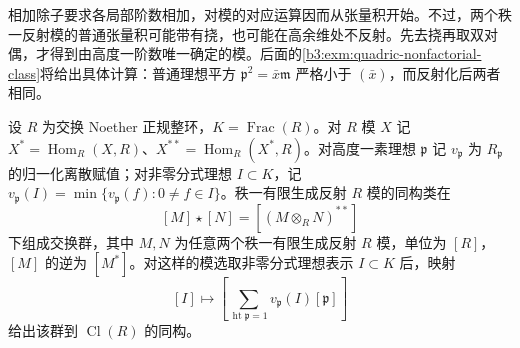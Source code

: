 相加除子要求各局部阶数相加，对模的对应运算因而从张量积开始。不过，两个秩一反射模的普通张量积可能带有挠，也可能在高余维处不反射。先去挠再取双对偶，才得到由高度一阶数唯一确定的模。后面的\cref{b3:exm:quadric-nonfactorial-class}将给出具体计算：普通理想平方 \(\mathfrak p^2=\bar x\mathfrak m\) 严格小于 \((\bar x)\)，而反射化后两者相同。

\begin{theorem}\label{b3:thm:class-group-reflexive}
	设 \(R\) 为交换 Noether 正规整环，\(K=\operatorname{Frac}(R)\)。对 \(R\) 模 \(X\) 记 \(X^*=\operatorname{Hom}_R(X,R)\)、\(X^{**}=\operatorname{Hom}_R(X^*,R)\)。对高度一素理想 \(\mathfrak p\) 记 \(v_{\mathfrak p}\) 为 \(R_{\mathfrak p}\) 的归一化离散赋值；对非零分式理想 \(I\subset K\)，记 \(v_{\mathfrak p}(I)=\min\{v_{\mathfrak p}(f):0\ne f\in I\}\)。秩一有限生成反射 \(R\) 模的同构类在
	\[
		[M]\mathbin{\star}[N]=[(M\otimes_RN)^{**}]
	\]
	下组成交换群，其中 \(M,N\) 为任意两个秩一有限生成反射 \(R\) 模，单位为 \([R]\)，\([M]\) 的逆为 \([M^*]\)。对这样的模选取非零分式理想表示 \(I\subset K\) 后，映射
	\[
		[I]\longmapsto\left[\sum_{\operatorname{ht}\mathfrak p=1} v_{\mathfrak p}(I)[\mathfrak p]\right]
	\]
	给出该群到 \(\operatorname{Cl}(R)\) 的同构。
\end{theorem}
